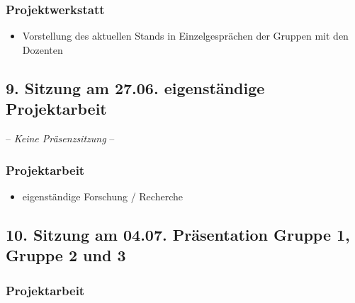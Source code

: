 \documentclass[
  ngerman,
]{article}
\providecommand{\tightlist}{%
  \setlength{\itemsep}{0pt}\setlength{\parskip}{0pt}}
\begin{document}
\hypertarget{projektwerkstatt}{%
\subsubsection*{Projektwerkstatt}\label{projektwerkstatt}}

\begin{itemize}
\tightlist
\item
  Vorstellung des aktuellen Stands in Einzelgesprächen der Gruppen mit den Dozenten
\end{itemize}

\hypertarget{sitzung-am-27.06.-eigenstuxe4ndige-projektarbeit}{%
\subsection*{9. Sitzung am 27.06. \textbar{} eigenständige Projektarbeit}\label{sitzung-am-27.06.-eigenstuxe4ndige-projektarbeit}}

-- \emph{Keine Präsenzsitzung} --

\hypertarget{projektarbeit-6}{%
\subsubsection*{Projektarbeit}\label{projektarbeit-6}}

\begin{itemize}
\tightlist
\item
  eigenständige Forschung / Recherche
\end{itemize}

\hypertarget{sitzung-am-04.07.-pruxe4sentation-gruppe-1-gruppe-2-und-3}{%
\subsection*{10. Sitzung am 04.07. \textbar{} Präsentation Gruppe 1, Gruppe 2 und 3}\label{sitzung-am-04.07.-pruxe4sentation-gruppe-1-gruppe-2-und-3}}

\hypertarget{projektarbeit-7}{%
\subsubsection*{Projektarbeit}\label{projektarbeit-7}}
\end{document}
